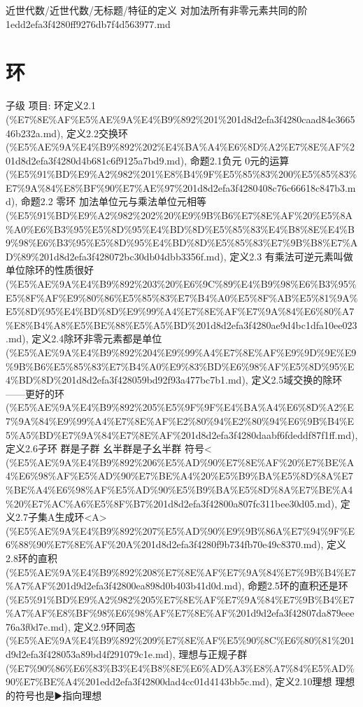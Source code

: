 \begin{note}[来源路径]

近世代数/近世代数/无标题/特征的定义 对加法所有非零元素共同的阶 1edd2efa3f4280ff9276db7f4d563977.md

\end{note}

\section*{环}

\begin{note}[环]

子级 项目: 环定义2.1 (\%E7\%8E\%AF\%E5\%AE\%9A\%E4\%B9\%892\%201\%201d8d2efa3f4280caad84e366546b232a.md), 定义2.2交换环 (\%E5\%AE\%9A\%E4\%B9\%892\%202\%E4\%BA\%A4\%E6\%8D\%A2\%E7\%8E\%AF\%201d8d2efa3f4280d4b681c6f9125a7bd9.md), 命题2.1负元 0元的运算 (\%E5\%91\%BD\%E9\%A2\%982\%201\%E8\%B4\%9F\%E5\%85\%83\%200\%E5\%85\%83\%E7\%9A\%84\%E8\%BF\%90\%E7\%AE\%97\%201d8d2efa3f4280408c76c66618c847b3.md), 命题2.2 零环 加法单位元与乘法单位元相等 (\%E5\%91\%BD\%E9\%A2\%982\%202\%20\%E9\%9B\%B6\%E7\%8E\%AF\%20\%E5\%8A\%A0\%E6\%B3\%95\%E5\%8D\%95\%E4\%BD\%8D\%E5\%85\%83\%E4\%B8\%8E\%E4\%B9\%98\%E6\%B3\%95\%E5\%8D\%95\%E4\%BD\%8D\%E5\%85\%83\%E7\%9B\%B8\%E7\%AD\%89\%201d8d2efa3f428072bc30db04dbb3356f.md), 定义2.3 有乘法可逆元素叫做单位除环的性质很好 (\%E5\%AE\%9A\%E4\%B9\%892\%203\%20\%E6\%9C\%89\%E4\%B9\%98\%E6\%B3\%95\%E5\%8F\%AF\%E9\%80\%86\%E5\%85\%83\%E7\%B4\%A0\%E5\%8F\%AB\%E5\%81\%9A\%E5\%8D\%95\%E4\%BD\%8D\%E9\%99\%A4\%E7\%8E\%AF\%E7\%9A\%84\%E6\%80\%A7\%E8\%B4\%A8\%E5\%BE\%88\%E5\%A5\%BD\%201d8d2efa3f4280ae9d4bc1dfa10ee023.md), 定义2.4除环非零元素都是单位 (\%E5\%AE\%9A\%E4\%B9\%892\%204\%E9\%99\%A4\%E7\%8E\%AF\%E9\%9D\%9E\%E9\%9B\%B6\%E5\%85\%83\%E7\%B4\%A0\%E9\%83\%BD\%E6\%98\%AF\%E5\%8D\%95\%E4\%BD\%8D\%201d8d2efa3f428059bd92f93a477bc7b1.md), 定义2.5域交换的除环——更好的环 (\%E5\%AE\%9A\%E4\%B9\%892\%205\%E5\%9F\%9F\%E4\%BA\%A4\%E6\%8D\%A2\%E7\%9A\%84\%E9\%99\%A4\%E7\%8E\%AF\%E2\%80\%94\%E2\%80\%94\%E6\%9B\%B4\%E5\%A5\%BD\%E7\%9A\%84\%E7\%8E\%AF\%201d8d2efa3f4280daabf6fdeddf87f1ff.md), 定义2.6子环 群是子群 幺半群是子幺半群 符号< (\%E5\%AE\%9A\%E4\%B9\%892\%206\%E5\%AD\%90\%E7\%8E\%AF\%20\%E7\%BE\%A4\%E6\%98\%AF\%E5\%AD\%90\%E7\%BE\%A4\%20\%E5\%B9\%BA\%E5\%8D\%8A\%E7\%BE\%A4\%E6\%98\%AF\%E5\%AD\%90\%E5\%B9\%BA\%E5\%8D\%8A\%E7\%BE\%A4\%20\%E7\%AC\%A6\%E5\%8F\%B7\%201d8d2efa3f42800a807fc311bee30d05.md), 定义2.7子集A生成环<A> (\%E5\%AE\%9A\%E4\%B9\%892\%207\%E5\%AD\%90\%E9\%9B\%86A\%E7\%94\%9F\%E6\%88\%90\%E7\%8E\%AF\%20A\%201d8d2efa3f4280f9b734fb70e49c8370.md), 定义2.8环的直积 (\%E5\%AE\%9A\%E4\%B9\%892\%208\%E7\%8E\%AF\%E7\%9A\%84\%E7\%9B\%B4\%E7\%A7\%AF\%201d9d2efa3f42800ea898d0b403b41d0d.md), 命题2.5环的直积还是环 (\%E5\%91\%BD\%E9\%A2\%982\%205\%E7\%8E\%AF\%E7\%9A\%84\%E7\%9B\%B4\%E7\%A7\%AF\%E8\%BF\%98\%E6\%98\%AF\%E7\%8E\%AF\%201d9d2efa3f42807da879eee76a3f0d7e.md), 定义2.9环同态 (\%E5\%AE\%9A\%E4\%B9\%892\%209\%E7\%8E\%AF\%E5\%90\%8C\%E6\%80\%81\%201d9d2efa3f428053a89bd4f291079c1e.md), 理想与正规子群 (\%E7\%90\%86\%E6\%83\%B3\%E4\%B8\%8E\%E6\%AD\%A3\%E8\%A7\%84\%E5\%AD\%90\%E7\%BE\%A4\%201edd2efa3f42800dad4cc01d4143bb5c.md), 定义2.10理想 理想的符号也是▶️指向理想 
\end{note}
